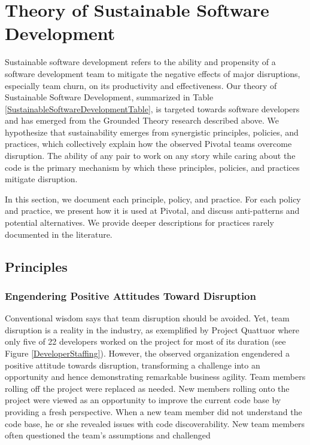 \section{Theory of Sustainable Software Development}
\label{Theory}

Sustainable software development refers to the ability and propensity of a software development team to mitigate the negative effects of major disruptions, especially team churn, on its productivity and effectiveness. Our theory of Sustainable Software Development, summarized in Table \ref{SustainableSoftwareDevelopmentTable}, is targeted towards software developers and has emerged from the Grounded Theory research described above. We hypothesize that sustainability emerges from synergistic principles, policies, and practices, which collectively explain how the observed Pivotal teams overcome disruption. The ability of any pair to work on any story while caring about the code is the primary mechanism by which these principles, policies, and practices mitigate disruption. 

In this section, we document each principle, policy, and practice.  For each policy and practice, we present how it is used at Pivotal, and discuss anti-patterns and potential alternatives. We provide deeper descriptions for practices rarely documented in the literature.
\subsection{Principles}

\subsubsection{Engendering Positive Attitudes Toward Disruption}
Conventional wisdom says that team disruption should be avoided. Yet, team disruption is a reality in the industry, as exemplified by Project Quattuor where only five of 22 developers worked on the project for most of its duration (see Figure \ref{DeveloperStaffing}). However, the observed organization engendered a positive attitude towards disruption, transforming a challenge into an opportunity and hence demonstrating remarkable business agility. Team members rolling off the project were replaced as needed. New members rolling onto the project were viewed as an opportunity to improve the current code base by providing a fresh perspective. When a new team member did not understand the code base, he or she revealed issues with code discoverability. New team members often questioned the team's assumptions and challenged  

